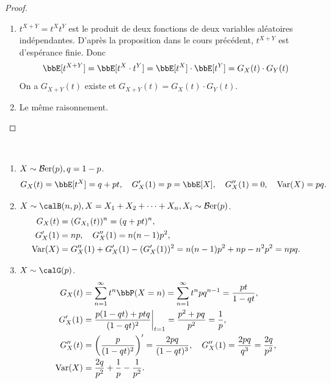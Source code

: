 \begin{proof}
    $\ $
    \begin{enumerate}
        \item $t^{X + Y} = t^X t^Y$ est le produit de deux fonctions de deux variables aléatoires indépendantes.
              D'après la proposition dans le cours précédent, $t^{X + Y}$ est d'espérance finie. Donc
              \[ \bbE[t^{X + Y}] = \bbE[t^X \cdot t^Y] = \bbE[t^X] \cdot \bbE[t^Y] = G_X(t) \cdot G_Y(t) \]
              On a $G_{X + Y}(t)$ existe et $G_{X + Y}(t) = G_X(t) \cdot G_Y(t)$.
        \item Le même raisonnement. \qedhere
    \end{enumerate}
\end{proof}

\begin{exem} $\ $
    \begin{enumerate}
        \item $X \sim \operatorname{\mathcal{B}er}(p), q = 1 - p$.
              \[ G_X(t) = \bbE[t^X] = q + pt, \quad G_X'(1) = p = \bbE[X], \quad G_X''(1) = 0, \quad \var(X) = pq. \]
        \item $X \sim \calB(n, p), X = X_1 + X_2 + \cdots + X_n, X_i \sim \ber(p)$.
              \begin{align*}
                  G_X(t)  & = (G_{X_1}(t))^n = (q + pt)^n,                                        \\
                  G_X'(1) & = np, \quad G_X''(1) = n(n - 1)p^2,                                   \\
                  \operatorname{Var}(X) & = G_X''(1) + G_X'(1) - (G_X'(1))^2 = n(n - 1)p^2 + np - n^2p^2 = npq.
              \end{align*}
        \item $X \sim \calG(p)$.
              \begin{align*}
                  G_X(t)   & = \sum_{n = 1}^\infty t^n \bbP(X = n) = \sum_{n = 1}^\infty t^npq^{n - 1} = \frac{pt}{1 - qt},                    \\
                  G_X'(1)  & = \frac{p(1 - qt) + ptq}{(1 - qt)^2}\bigg|_{t = 1} = \frac{p^2 + pq}{p^2} = \frac{1}{p},                          \\
                  G_X''(t) & = \left(\frac{p}{(1 - qt)^2}\right)' = \frac{2pq}{(1 - qt)^3}, \quad G_X''(1) = \frac{2pq}{q^3} = \frac{2q}{p^2}, \\
                  \var(X)  & = \frac{2q}{p^2} + \frac{1}{p} - \frac{1}{p^2}.
              \end{align*}

\end{enumerate}
\end{exem}
